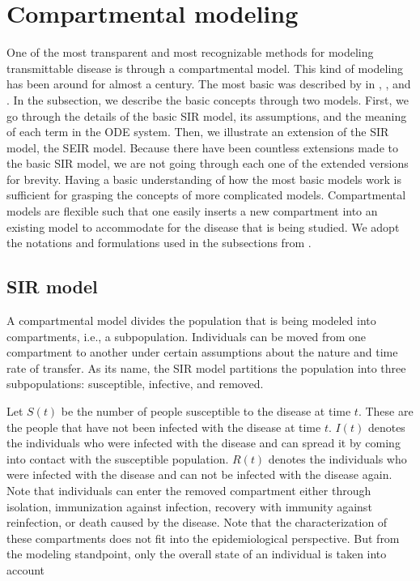 \section{Compartmental modeling}

One of the most transparent and most recognizable methods for modeling transmittable disease is through a compartmental model.
This kind of modeling has been around for almost a century.
The most basic was described by \citeauthor{kermackContributionMathematicalTheory1927} in \citeyear{kermackContributionMathematicalTheory1927}, \citeyear{kermackContributionsMathematicalTheory1932}, and \citeyear{ kermackContributionsMathematicalTheory1933} \cite{kermackContributionMathematicalTheory1927, kermackContributionsMathematicalTheory1932, kermackContributionsMathematicalTheory1933}.
In the subsection, we describe the basic concepts through two models.
First, we go through the details of the basic \gls{SIR} model, its assumptions, and the meaning of each term in the \gls{ODE} system.
Then, we illustrate an extension of the \gls{SIR} model, the \gls{SEIR} model.
Because there have been countless extensions made to the basic \gls{SIR} model, we are not going through each one of the extended versions for brevity.
Having a basic understanding of how the most basic models work is sufficient for grasping the concepts of more complicated models.
Compartmental models are flexible such that one easily inserts a new compartment into an existing model to accommodate for the disease that is being studied.
We adopt the notations and formulations used in the subsections from \citeauthor{brauerCompartmentalModelsEpidemiology2008} \cite{brauerCompartmentalModelsEpidemiology2008}.

\subsection{SIR model}

A compartmental model divides the population that is being modeled into compartments, i.e., a subpopulation.
Individuals can be moved from one compartment to another under certain assumptions about the nature and time rate of transfer.
As its name, the \gls{SIR} model partitions the population into three subpopulations: susceptible, infective, and removed.

Let $S(t)$ be the number of people susceptible to the disease at time $t$.
These are the people that have not been infected with the disease at time $t$.
$I(t)$ denotes the individuals who were infected with the disease and can spread it by coming into contact with the susceptible population.
$R(t)$ denotes the individuals who were infected with the disease and can not be infected with the disease again.
Note that individuals can enter the removed compartment either through isolation, immunization against infection, recovery with immunity against reinfection, or death caused by the disease.
Note that the characterization of these compartments does not fit into the epidemiological perspective.
But from the modeling standpoint, only the overall state of an individual is taken into account

